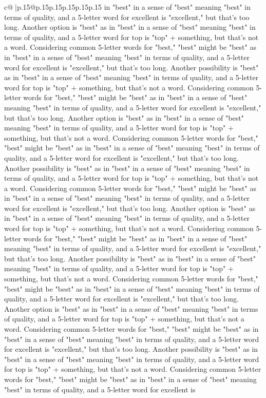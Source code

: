 \documentclass{article}
\begin{document}
{\begin{supertabular}{c@{$\;$}|p{.15\linewidth}@{}p{.15\linewidth}p{.15\linewidth}p{.15\linewidth}p{.15\linewidth}p{.15\linewidth}}
{{{in "best" in a sense of "best" meaning "best" in terms of quality, and a 5{-}letter word for excellent is "excellent," but that's too long. Another option is "best" as in "best" in a sense of "best" meaning "best" in terms of quality, and a 5{-}letter word for top is "top" + something, but that's not a word. Considering common 5{-}letter words for "best," "best" might be "best" as in "best" in a sense of "best" meaning "best" in terms of quality, and a 5{-}letter word for excellent is "excellent," but that's too long. Another possibility is "best" as in "best" in a sense of "best" meaning "best" in terms of quality, and a 5{-}letter word for top is "top" + something, but that's not a word. Considering common 5{-}letter words for "best," "best" might be "best" as in "best" in a sense of "best" meaning "best" in terms of quality, and a 5{-}letter word for excellent is "excellent," but that's too long. Another option is "best" as in "best" in a sense of "best" meaning "best" in terms of quality, and a 5{-}letter word for top is "top" + something, but that's not a word. Considering common 5{-}letter words for "best," "best" might be "best" as in "best" in a sense of "best" meaning "best" in terms of quality, and a 5{-}letter word for excellent is "excellent," but that's too long. Another possibility is "best" as in "best" in a sense of "best" meaning "best" in terms of quality, and a 5{-}letter word for top is "top" + something, but that's not a word. Considering common 5{-}letter words for "best," "best" might be "best" as in "best" in a sense of "best" meaning "best" in terms of quality, and a 5{-}letter word for excellent is "excellent," but that's too long. Another option is "best" as in "best" in a sense of "best" meaning "best" in terms of quality, and a 5{-}letter word for top is "top" + something, but that's not a word. Considering common 5{-}letter words for "best," "best" might be "best" as in "best" in a sense of "best" meaning "best" in terms of quality, and a 5{-}letter word for excellent is "excellent," but that's too long. Another possibility is "best" as in "best" in a sense of "best" meaning "best" in terms of quality, and a 5{-}letter word for top is "top" + something, but that's not a word. Considering common 5{-}letter words for "best," "best" might be "best" as in "best" in a sense of "best" meaning "best" in terms of quality, and a 5{-}letter word for excellent is "excellent," but that's too long. Another option is "best" as in "best" in a sense of "best" meaning "best" in terms of quality, and a 5{-}letter word for top is "top" + something, but that's not a word. Considering common 5{-}letter words for "best," "best" might be "best" as in "best" in a sense of "best" meaning "best" in terms of quality, and a 5{-}letter word for excellent is "excellent," but that's too long. Another possibility is "best" as in "best" in a sense of "best" meaning "best" in terms of quality, and a 5{-}letter word for top is "top" + something, but that's not a word. Considering common 5{-}letter words for "best," "best" might be "best" as in "best" in a sense of "best" meaning "best" in terms of quality, and a 5{-}letter word for excellent is }}}
\end{supertabular}}
\end{document}

